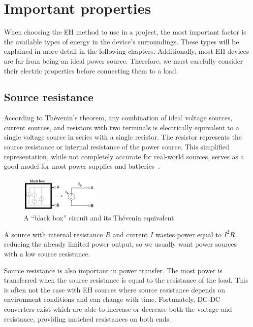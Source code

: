 \documentclass[a4paper,10pt]{article}
\begin{document}
\section{Important properties}

When choosing the \ac{EH} method to use in a project, the most important factor is the available types of energy in the device's surroundings. These types will be explained in more detail in the following chapters. Additionally, most \ac{EH} devices are far from being an ideal power source. Therefore, we must carefully consider their electric properties before connecting them to a load. 

\subsection{Source resistance}

According to Th\'evenin's theorem, any combination of ideal voltage sources, current sources, and resistors with two terminals is electrically equivalent to a single voltage source in series with a single resistor. The resistor represents the source resistance or internal resistance of the power source. This simplified representation, while not completely accurate for real-world sources, serves as a good model for most power supplies and batteries~\cite{wiki:thevenin}. 

\begin{figure}
\centering
  \includegraphics[width=150px]{./Slike/Thevenin_equivalent}
  \caption{A ``black box'' circuit and its Th\'evenin equivalent~\cite{wiki:thevenin}}
\label{fig:thevenin}
\end{figure}

A source with internal resistance $R$ and current $I$ wastes power equal to $I^2 R$, reducing the already limited power output, so we usually want power sources with a low source resistance. 

Source resistance is also important in power transfer. The most power is transferred when the source resistance is equal to the resistance of the load. This is often not the case with \ac{EH} sources where source resistance depends on environment conditions and can change with time. Fortunately, DC-DC converters exist which are able to increase or decrease both the voltage and resistance, providing matched resistances on both ends. 
\end{document}

